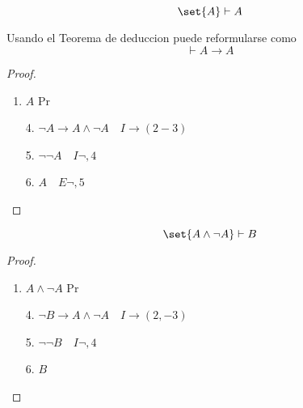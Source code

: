 \vspace{1cm}
\begin{theorem}
	\[
		\set{A} \vdash A
	\]

	Usando el Teorema de deduccion puede reformularse como
	\[
		\vdash A \rightarrow A
	\]
\end{theorem}
\begin{proof}
	~\begin{enumerate}
		\item \(A \) Pr
	\end{enumerate}
	\begin{enumerate}
		\item[4.] \(\neg A \rightarrow A \wedge \neg A \quad I\rightarrow(2-3)\)
		\item[5.] \(\neg \neg A \quad I\neg, 4\)
		\item[6.] \(A \quad E\neg,5\)
	\end{enumerate}
\end{proof}

\begin{theorem}
	\[
		\set{A \wedge \neg A} \vdash B
	\]
\end{theorem}
\begin{proof}~\\
	\begin{enumerate}
		\item \(A \wedge \neg A \) Pr
	\end{enumerate}
	\begin{enumerate}
		\item[4.] \(\neg B \to A \wedge \neg A \quad I\to(2,-3)\)
		\item[5.] \(\neg \neg B \quad I\neg,4\)
		\item[6.] \(B \quad \)
	\end{enumerate}
\end{proof}

